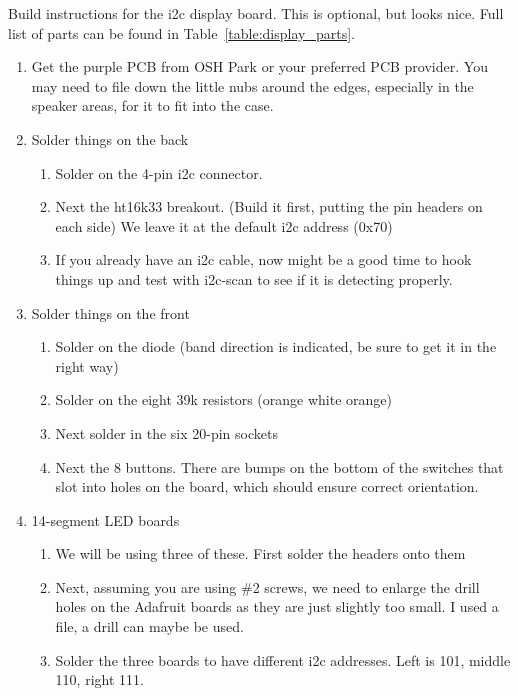 \documentclass[11pt]{article}
\begin{document}
Build instructions for the i2c display board.
This is optional, but looks nice.
Full list of parts can be found in Table~\ref{table:display_parts}.

\begin{enumerate}
\item	Get the purple PCB from OSH Park or your preferred PCB provider.
	You may need to file down the little nubs around the edges, especially in the 
	speaker areas, for it to fit into the case.

\item Solder things on the back
	\begin{enumerate}
		\item	Solder on the 4-pin i2c connector.
		\item	Next the ht16k33 breakout.  (Build it first, putting the pin
			headers on each side)  We leave it at the default i2c address (0x70)
		\item	If you already have an i2c cable, now might be a good time to hook 
			things up and test with i2c-scan to see if it is detecting properly.
	\end{enumerate}

\item Solder things on the front
	\begin{enumerate}
	\item	Solder on the diode (band direction is indicated, be sure to get it in
		the right way)
	\item	Solder on the eight 39k resistors (orange white orange)
	\item	Next solder in the six 20-pin sockets
	\item	Next the 8 buttons.
		There are bumps on the bottom of the
		switches that slot into holes on the board, which should
		ensure correct orientation.
	\end{enumerate}

\item 14-segment LED boards

	\begin{enumerate}

		\item	We will be using three of these.
			First solder the headers onto them

		\item  Next, assuming you are using \#2 screws, we need to enlarge the
			drill holes on the Adafruit boards as they are just slightly too
			small.  I used a file, a drill can maybe be used.

		\item Solder the three boards to have different i2c addresses.
			Left is 101, middle 110, right 111.


\end{enumerate}
\end{enumerate}
\end{document}
